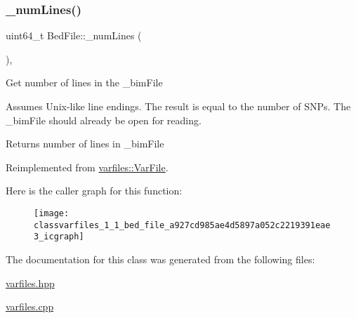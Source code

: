 \subsubsection{\texorpdfstring{\+\_\+num\+Lines()}{\_numLines()}}
{\footnotesize\ttfamily uint64\+\_\+t Bed\+File\+::\+\_\+num\+Lines (\begin{DoxyParamCaption}{ }\end{DoxyParamCaption})\hspace{0.3cm}{\ttfamily [protected]}, {\ttfamily [virtual]}}



Get number of lines in the {\ttfamily \+\_\+bim\+File} 

Assumes Unix-\/like line endings. The result is equal to the number of S\+N\+Ps. The {\ttfamily \+\_\+bim\+File} should already be open for reading.

\begin{DoxyReturn}{Returns}
number of lines in {\ttfamily \+\_\+bim\+File} 
\end{DoxyReturn}


Reimplemented from \hyperlink{classvarfiles_1_1_var_file_a029a1a5577fb735c338750d2dec62ab6}{varfiles\+::\+Var\+File}.

Here is the caller graph for this function\+:\nopagebreak
\begin{figure}[H]
\begin{center}
\leavevmode
\texttt{[image: classvarfiles\_1\_1\_bed\_file\_a927cd985ae4d5897a052c2219391eae3\_icgraph]}
\end{center}
\end{figure}


The documentation for this class was generated from the following files\+:\begin{DoxyCompactItemize}
\item 
\hyperlink{varfiles_8hpp}{varfiles.\+hpp}\item 
\hyperlink{varfiles_8cpp}{varfiles.\+cpp}\end{DoxyCompactItemize}
